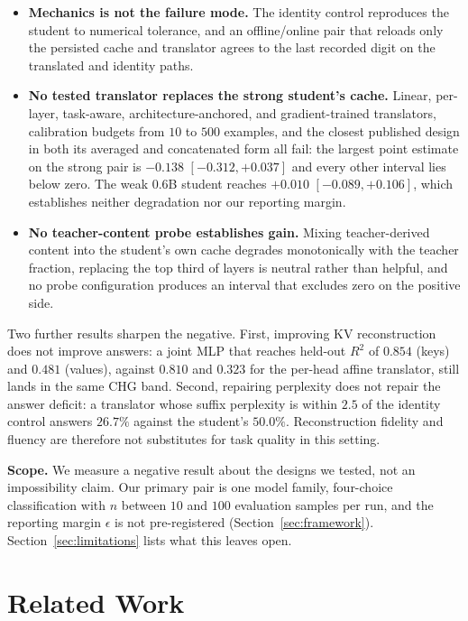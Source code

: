 \documentclass{article} %
\newcommand{\kv}{\ensuremath{\mathrm{KV}}}
\begin{document}
\begin{itemize}
\item \textbf{Mechanics is not the failure mode.} The identity control
reproduces the student to numerical tolerance, and an offline/online pair that
reloads only the persisted cache and translator agrees to the last recorded
digit on the translated and identity paths.
\item \textbf{No tested translator replaces the strong student's cache.} Linear,
per-layer, task-aware, architecture-anchored, and gradient-trained
translators, calibration budgets from $10$ to $500$ examples, and the closest
published design in both its averaged and concatenated form all fail: the
largest point estimate on the strong pair is $-0.138$ $[-0.312,+0.037]$ and
every other interval lies below zero. The weak $0.6$B student reaches $+0.010$
$[-0.089,+0.106]$, which establishes neither degradation nor our reporting
margin.
\item \textbf{No teacher-content probe establishes gain.} Mixing teacher-derived
content into the student's own cache degrades monotonically with the teacher
fraction, replacing the top third of layers is neutral rather than helpful, and
no probe configuration produces an interval that excludes zero on the positive
side.
\end{itemize}

Two further results sharpen the negative. First, improving \kv{}
reconstruction does not improve answers: a joint MLP that reaches held-out
$R^2$ of $0.854$ (keys) and $0.481$ (values), against $0.810$ and $0.323$ for
the per-head affine translator, still lands in the same CHG band. Second, repairing
perplexity does not repair the answer deficit: a translator whose suffix
perplexity is within $2.5$ of the identity control answers $26.7\%$ against the
student's $50.0\%$. Reconstruction fidelity and fluency are therefore not
substitutes for task quality in this setting.

\textbf{Scope.} We measure a negative result about the designs we tested, not
an impossibility claim. Our primary pair is one model family, four-choice
classification with $n$ between $10$ and $100$ evaluation samples per run, and
the reporting margin $\epsilon$ is not pre-registered
(Section~\ref{sec:framework}). Section~\ref{sec:limitations} lists what this
leaves open.


\section{Related Work}
\label{sec:survey}
\end{document}
